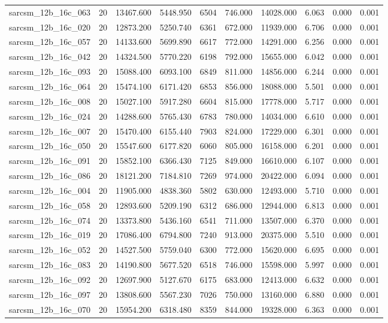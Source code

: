 \begin{tabular}{lrrrrrrrrr}
sarcsm\_12b\_16c\_063 & 20 & 13467.600 & 5448.950 & 6504 & 746.000 & 14028.000 & 6.063 & 0.000 & 0.001 \\
sarcsm\_12b\_16c\_020 & 20 & 12873.200 & 5250.740 & 6361 & 672.000 & 11939.000 & 6.706 & 0.000 & 0.001 \\
sarcsm\_12b\_16c\_057 & 20 & 14133.600 & 5699.890 & 6617 & 772.000 & 14291.000 & 6.256 & 0.000 & 0.001 \\
sarcsm\_12b\_16c\_042 & 20 & 14324.500 & 5770.220 & 6198 & 792.000 & 15655.000 & 6.042 & 0.000 & 0.001 \\
sarcsm\_12b\_16c\_093 & 20 & 15088.400 & 6093.100 & 6849 & 811.000 & 14856.000 & 6.244 & 0.000 & 0.001 \\
sarcsm\_12b\_16c\_064 & 20 & 15474.100 & 6171.420 & 6853 & 856.000 & 18088.000 & 5.501 & 0.000 & 0.001 \\
sarcsm\_12b\_16c\_008 & 20 & 15027.100 & 5917.280 & 6604 & 815.000 & 17778.000 & 5.717 & 0.000 & 0.001 \\
sarcsm\_12b\_16c\_024 & 20 & 14288.600 & 5765.430 & 6783 & 780.000 & 14034.000 & 6.610 & 0.000 & 0.001 \\
sarcsm\_12b\_16c\_007 & 20 & 15470.400 & 6155.440 & 7903 & 824.000 & 17229.000 & 6.301 & 0.000 & 0.001 \\
sarcsm\_12b\_16c\_050 & 20 & 15547.600 & 6177.820 & 6060 & 805.000 & 16158.000 & 6.201 & 0.000 & 0.001 \\
sarcsm\_12b\_16c\_091 & 20 & 15852.100 & 6366.430 & 7125 & 849.000 & 16610.000 & 6.107 & 0.000 & 0.001 \\
sarcsm\_12b\_16c\_086 & 20 & 18121.200 & 7184.810 & 7269 & 974.000 & 20422.000 & 6.094 & 0.000 & 0.001 \\
sarcsm\_12b\_16c\_004 & 20 & 11905.000 & 4838.360 & 5802 & 630.000 & 12493.000 & 5.710 & 0.000 & 0.001 \\
sarcsm\_12b\_16c\_058 & 20 & 12893.600 & 5209.190 & 6312 & 686.000 & 12944.000 & 6.813 & 0.000 & 0.001 \\
sarcsm\_12b\_16c\_074 & 20 & 13373.800 & 5436.160 & 6541 & 711.000 & 13507.000 & 6.370 & 0.000 & 0.001 \\
sarcsm\_12b\_16c\_019 & 20 & 17086.400 & 6794.800 & 7240 & 913.000 & 20375.000 & 5.510 & 0.000 & 0.001 \\
sarcsm\_12b\_16c\_052 & 20 & 14527.500 & 5759.040 & 6300 & 772.000 & 15620.000 & 6.695 & 0.000 & 0.001 \\
sarcsm\_12b\_16c\_083 & 20 & 14190.800 & 5677.520 & 6518 & 746.000 & 15598.000 & 5.997 & 0.000 & 0.001 \\
sarcsm\_12b\_16c\_092 & 20 & 12697.900 & 5127.670 & 6175 & 683.000 & 12413.000 & 6.632 & 0.000 & 0.001 \\
sarcsm\_12b\_16c\_097 & 20 & 13808.600 & 5567.230 & 7026 & 750.000 & 13160.000 & 6.880 & 0.000 & 0.001 \\
sarcsm\_12b\_16c\_070 & 20 & 15954.200 & 6318.480 & 8359 & 844.000 & 19328.000 & 6.363 & 0.000 & 0.001 \\
\bottomrule
\end{tabular}

